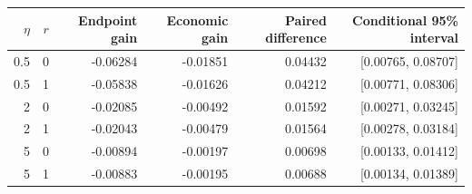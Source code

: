 \begin{tabular}{rrrrrr}
\toprule
$\eta$ & $r$ & Endpoint gain & Economic gain & Paired difference & Conditional 95\% interval \\
\midrule
0.5 & 0 & -0.06284 & -0.01851 & 0.04432 & [0.00765, 0.08707] \\
0.5 & 1 & -0.05838 & -0.01626 & 0.04212 & [0.00771, 0.08306] \\
2 & 0 & -0.02085 & -0.00492 & 0.01592 & [0.00271, 0.03245] \\
2 & 1 & -0.02043 & -0.00479 & 0.01564 & [0.00278, 0.03184] \\
5 & 0 & -0.00894 & -0.00197 & 0.00698 & [0.00133, 0.01412] \\
5 & 1 & -0.00883 & -0.00195 & 0.00688 & [0.00134, 0.01389] \\
\bottomrule
\end{tabular}
